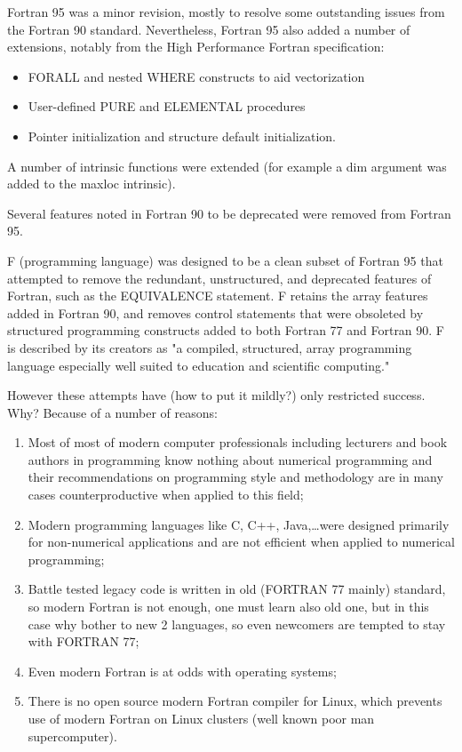 \documentclass[a4paper]{article}
\begin{document}
Fortran 95 was a minor revision, mostly to resolve some outstanding issues from the Fortran 90 standard. Nevertheless, Fortran 95 also added a number of extensions, notably from the High Performance Fortran specification:
\begin{itemize}
    \item FORALL and nested WHERE constructs to aid vectorization
    \item User-defined PURE and ELEMENTAL procedures
    \item Pointer initialization and structure default initialization.
\end {itemize}
A number of intrinsic functions were extended (for example a dim argument was added to the maxloc intrinsic).

Several features noted in Fortran 90 to be deprecated were removed from Fortran 95.

F (programming language)\cite {f-ep} was designed to be a clean subset of Fortran 95 that attempted to remove the redundant, unstructured, and deprecated features of Fortran, such as the EQUIVALENCE statement. F retains the array features added in Fortran 90, and removes control statements that were obsoleted by structured programming constructs added to both Fortran 77 and Fortran 90. F is described by its creators as "a compiled, structured, array programming language especially well suited to education and scientific computing." 
    
However these attempts have (how to put it mildly?) only restricted success. Why?
Because of a number of reasons:
\begin{enumerate}
\item Most of most of modern computer professionals including lecturers and book authors in programming know nothing about numerical programming and their recommendations on programming style and methodology are in many cases counterproductive when applied to this field;
\item Modern programming languages like C, C++, Java,\ldots were designed primarily for non-numerical applications and are not efficient when applied to numerical programming;
\item Battle tested legacy code is written in old (FORTRAN 77 mainly) standard, so modern Fortran is not enough, one must learn also old one, but in this case why bother to new 2 languages, so even newcomers are tempted to stay with FORTRAN 77;
\item Even modern Fortran is at odds with operating systems;
\item There is no open source modern Fortran compiler for Linux, which prevents use of modern Fortran on Linux clusters  (well known poor man supercomputer).
\end{enumerate}
\end{document}
